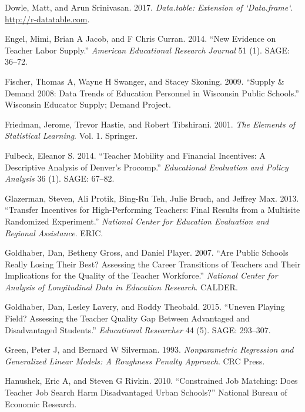 \documentclass[12pt,]{article}
\begin{document}
\hypertarget{ref-dowle}{}
Dowle, Matt, and Arun Srinivasan. 2017. \emph{Data.table: Extension of
`Data.frame`}. \url{http://r-datatable.com}.

\hypertarget{ref-engel}{}
Engel, Mimi, Brian A Jacob, and F Chris Curran. 2014. ``New Evidence on
Teacher Labor Supply.'' \emph{American Educational Research Journal} 51
(1). SAGE: 36--72.

\hypertarget{ref-fischer}{}
Fischer, Thomas A, Wayne H Swanger, and Stacey Skoning. 2009. ``Supply
\& Demand 2008: Data Trends of Education Personnel in Wisconsin Public
Schools.'' Wisconsin Educator Supply; Demand Project.

\hypertarget{ref-friedman}{}
Friedman, Jerome, Trevor Hastie, and Robert Tibshirani. 2001. \emph{The
Elements of Statistical Learning}. Vol. 1. Springer.

\hypertarget{ref-fulbeck}{}
Fulbeck, Eleanor S. 2014. ``Teacher Mobility and Financial Incentives: A
Descriptive Analysis of Denver's Procomp.'' \emph{Educational Evaluation
and Policy Analysis} 36 (1). SAGE: 67--82.

\hypertarget{ref-glazerman}{}
Glazerman, Steven, Ali Protik, Bing-Ru Teh, Julie Bruch, and Jeffrey
Max. 2013. ``Transfer Incentives for High-Performing Teachers: Final
Results from a Multisite Randomized Experiment.'' \emph{National Center
for Education Evaluation and Regional Assistance}. ERIC.

\hypertarget{ref-goldhaber2007}{}
Goldhaber, Dan, Betheny Gross, and Daniel Player. 2007. ``Are Public
Schools Really Losing Their Best? Assessing the Career Transitions of
Teachers and Their Implications for the Quality of the Teacher
Workforce.'' \emph{National Center for Analysis of Longitudinal Data in
Education Research}. CALDER.

\hypertarget{ref-goldhaber2015}{}
Goldhaber, Dan, Lesley Lavery, and Roddy Theobald. 2015. ``Uneven
Playing Field? Assessing the Teacher Quality Gap Between Advantaged and
Disadvantaged Students.'' \emph{Educational Researcher} 44 (5). SAGE:
293--307.

\hypertarget{ref-green}{}
Green, Peter J, and Bernard W Silverman. 1993. \emph{Nonparametric
Regression and Generalized Linear Models: A Roughness Penalty Approach}.
CRC Press.

\hypertarget{ref-hanushek2010}{}
Hanushek, Eric A, and Steven G Rivkin. 2010. ``Constrained Job Matching:
Does Teacher Job Search Harm Disadvantaged Urban Schools?'' National
Bureau of Economic Research.
\end{document}
